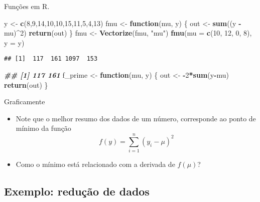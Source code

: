\documentclass[
]{article}
\newenvironment{Shaded}{\begin{snugshade}}{\end{snugshade}}
\newcommand{\AttributeTok}[1]{\textcolor[rgb]{0.13,0.29,0.53}{#1}}
\newcommand{\ControlFlowTok}[1]{\textcolor[rgb]{0.13,0.29,0.53}{\textbf{#1}}}
\newcommand{\DecValTok}[1]{\textcolor[rgb]{0.00,0.00,0.81}{#1}}
\newcommand{\DocumentationTok}[1]{\textcolor[rgb]{0.56,0.35,0.01}{\textbf{\textit{#1}}}}
\newcommand{\FunctionTok}[1]{\textcolor[rgb]{0.13,0.29,0.53}{\textbf{#1}}}
\newcommand{\NormalTok}[1]{#1}
\newcommand{\OtherTok}[1]{\textcolor[rgb]{0.56,0.35,0.01}{#1}}
\newcommand{\SpecialCharTok}[1]{\textcolor[rgb]{0.81,0.36,0.00}{\textbf{#1}}}
\newcommand{\StringTok}[1]{\textcolor[rgb]{0.31,0.60,0.02}{#1}}
\begin{document}
Funções em R.

\begin{Shaded}
\begin{Highlighting}[]
\NormalTok{y }\OtherTok{\textless{}{-}} \FunctionTok{c}\NormalTok{(}\DecValTok{8}\NormalTok{,}\DecValTok{9}\NormalTok{,}\DecValTok{14}\NormalTok{,}\DecValTok{10}\NormalTok{,}\DecValTok{10}\NormalTok{,}\DecValTok{15}\NormalTok{,}\DecValTok{11}\NormalTok{,}\DecValTok{5}\NormalTok{,}\DecValTok{4}\NormalTok{,}\DecValTok{13}\NormalTok{)}
\NormalTok{fmu }\OtherTok{\textless{}{-}} \ControlFlowTok{function}\NormalTok{(mu, y) \{}
\NormalTok{out }\OtherTok{\textless{}{-}} \FunctionTok{sum}\NormalTok{((y }\SpecialCharTok{{-}}\NormalTok{ mu)}\SpecialCharTok{\^{}}\DecValTok{2}\NormalTok{)}
\FunctionTok{return}\NormalTok{(out)}
\NormalTok{\}}
\NormalTok{fmu }\OtherTok{\textless{}{-}} \FunctionTok{Vectorize}\NormalTok{(fmu, }\StringTok{"mu"}\NormalTok{)}
\FunctionTok{fmu}\NormalTok{(}\AttributeTok{mu =} \FunctionTok{c}\NormalTok{(}\DecValTok{10}\NormalTok{, }\DecValTok{12}\NormalTok{, }\DecValTok{0}\NormalTok{, }\DecValTok{8}\NormalTok{), }\AttributeTok{y =}\NormalTok{ y)}
\end{Highlighting}
\end{Shaded}

\begin{verbatim}
## [1]  117  161 1097  153
\end{verbatim}

\begin{Shaded}
\begin{Highlighting}[]
\DocumentationTok{\#\# [1] 117 161}
\NormalTok{f\_prime }\OtherTok{\textless{}{-}} \ControlFlowTok{function}\NormalTok{(mu, y) \{}
\NormalTok{out }\OtherTok{\textless{}{-}} \SpecialCharTok{{-}}\DecValTok{2}\SpecialCharTok{*}\FunctionTok{sum}\NormalTok{(y}\SpecialCharTok{{-}}\NormalTok{mu)}
\FunctionTok{return}\NormalTok{(out)}
\NormalTok{\}}
\end{Highlighting}
\end{Shaded}

Graficamente

\begin{itemize}
\item
  Note que o melhor resumo dos dados de um número, corresponde ao ponto
  de mínimo da função \[
  f(y) = \sum_{i=1}^{n} (y_{i} -\mu )^2
  \]
\item
  Como o mínimo está relacionado com a derivada de \(f(\mu)\)?
\end{itemize}

\hypertarget{exemplo-reduuxe7uxe3o-de-dados}{%
\subsection{Exemplo: redução de
dados}\label{exemplo-reduuxe7uxe3o-de-dados}}
\end{document}

